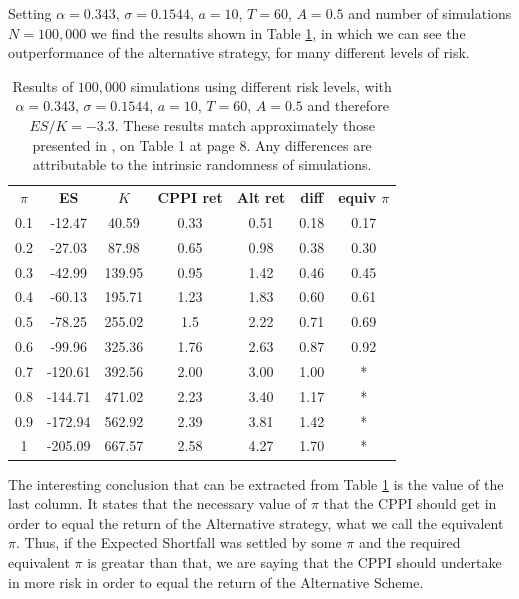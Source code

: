 Setting $\alpha = 0.343$, $\sigma = 0.1544$, $a = 10$, $T = 60$, $A = 0.5$ and number of simulations $N = 100,000$ we find the results shown in Table \ref{tab:cppi_alt}, in which we can see the outperformance of the alternative strategy, for many different levels of risk.

\begin{table}[h]
\centering
\caption{Results of $100,000$ simulations using different risk levels, with $\alpha = 0.343$, $\sigma = 0.1544$, $a = 10$, $T = 60$, $A = 0.5$ and therefore $ES/K = -3.3$. These results match approximately those presented in \cite{a:guillen-optimisation}, on Table 1 at page 8. Any differences are attributable to the intrinsic randomness of simulations.}
\label{tab:cppi_alt}
\begin{tabular}{ccccccc}
\textbf{$\pi$} & \textbf{ES } & \textbf{$K$} & \textbf{CPPI ret} & \textbf{Alt ret} & \textbf{diff}  & \textbf{equiv $\pi$}\\
0.1   & -12.47  & 40.59  & 0.33     & 0.51    & 0.18    & 0.17\\
0.2   & -27.03  & 87.98  & 0.65     & 0.98    & 0.38    & 0.30 \\
0.3   & -42.99  & 139.95 & 0.95     & 1.42    & 0.46    & 0.45 \\
0.4   & -60.13  & 195.71 & 1.23     & 1.83    & 0.60    & 0.61 \\
0.5   & -78.25  & 255.02 & 1.5      & 2.22    & 0.71    & 0.69 \\
0.6   & -99.96  & 325.36 & 1.76     & 2.63    & 0.87    & 0.92 \\
0.7   & -120.61 & 392.56 & 2.00     & 3.00    & 1.00    & * \\
0.8   & -144.71 & 471.02 & 2.23     & 3.40    & 1.17    & * \\
0.9   & -172.94 & 562.92 & 2.39     & 3.81    & 1.42    & * \\
1     & -205.09 & 667.57 & 2.58     & 4.27    & 1.70    & *
\end{tabular}
\end{table}

The interesting conclusion that can be extracted from Table \ref{tab:cppi_alt} is the value of the last column. It states that the necessary value of $\pi$ that the CPPI should get in order to equal the return of the Alternative strategy, what we call the equivalent $\pi$. Thus, if the Expected Shortfall was settled by some $\pi$ and the required equivalent $\pi$ is greatar than that, we are saying that the CPPI should undertake in more risk in order to equal the return of the Alternative Scheme.


